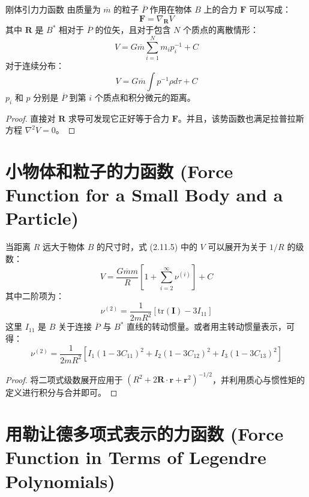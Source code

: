 \begin{myTheorem}{刚体引力力函数}
由质量为 \(\overline{m}\) 的粒子 \(\overline{P}\) 作用在物体 \(B\) 上的合力 \(\mathbf{F}\) 可以写成：
\begin{equation}
\mathbf{F} = \nabla_{\mathbf{R}} V \tag{1}
\end{equation}
其中 \(\mathbf{R}\) 是 \(B^*\) 相对于 \(\overline{P}\) 的位矢，且对于包含 \(N\) 个质点的离散情形：
\begin{equation}
V = G\overline{m}\sum_{i=1}^N m_i p_i^{-1} + C \tag{2}
\end{equation}
对于连续分布：
\begin{equation}
V = G\overline{m}\int p^{-1}\rho d\tau + C \tag{5}
\end{equation}
\(p_i\) 和 \(p\) 分别是 \(\overline{P}\) 到第 \(i\) 个质点和积分微元的距离。
\end{myTheorem}
\begin{proof}
直接对 \(\mathbf{R}\) 求导可发现它正好等于合力 \(\mathbf{F}\)。并且，该势函数也满足拉普拉斯方程 \(\nabla^2 V = 0\)。
\end{proof}

\section{小物体和粒子的力函数 (Force Function for a Small Body and a Particle)}

当距离 \(R\) 远大于物体 \(B\) 的尺寸时，式 (2.11.5) 中的 \(V\) 可以展开为关于 \(1/R\) 的级数：
\begin{equation}
V = \frac{G\overline{m}m}{R}\left[1 + \sum_{i=2}^\infty \nu^{(i)}\right] + C \tag{1}
\end{equation}
其中二阶项为：
\begin{equation}
\nu^{(2)} = \frac{1}{2mR^2}\left[\mathrm{tr}(\mathbf{I}) - 3I_{11}\right] \tag{2}
\end{equation}
这里 \(I_{11}\) 是 \(B\) 关于连接 \(\overline{P}\) 与 \(B^*\) 直线的转动惯量。或者用主转动惯量表示，可得：
\begin{equation}
\nu^{(2)} = \frac{1}{2mR^2}\left[I_1(1 - 3C_{11})^2 + I_2(1 - 3C_{12})^2 + I_3(1 - 3C_{13})^2\right] \tag{6}
\end{equation}
\begin{proof}
将二项式级数展开应用于 \((R^2+2\mathbf{R}\cdot\mathbf{r}+\mathbf{r}^2)^{-1/2}\)，并利用质心与惯性矩的定义进行积分与合并即可。
\end{proof}

\section{用勒让德多项式表示的力函数 (Force Function in Terms of Legendre Polynomials)}

